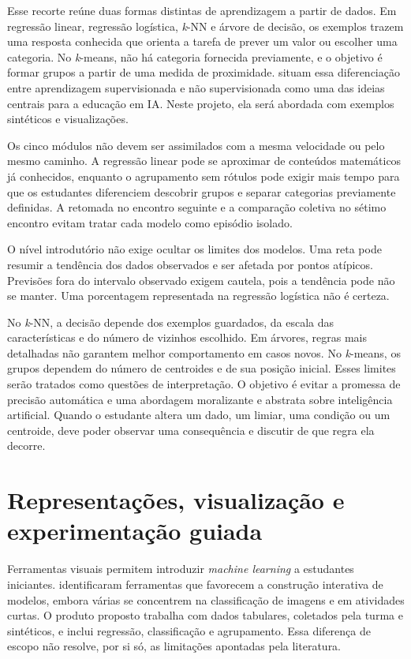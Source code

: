 Esse recorte reúne duas formas distintas de aprendizagem a partir de dados. Em regressão linear, regressão logística, \textit{k}-NN e árvore de decisão, os exemplos trazem uma resposta conhecida que orienta a tarefa de prever um valor ou escolher uma categoria. No \textit{k}-means, não há categoria fornecida previamente, e o objetivo é formar grupos a partir de uma medida de proximidade.  situam essa diferenciação entre aprendizagem supervisionada e não supervisionada como uma das ideias centrais para a educação em IA. Neste projeto, ela será abordada com exemplos sintéticos e visualizações.

Os cinco módulos não devem ser assimilados com a mesma velocidade ou pelo mesmo caminho. A regressão linear pode se aproximar de conteúdos matemáticos já conhecidos, enquanto o agrupamento sem rótulos pode exigir mais tempo para que os estudantes diferenciem descobrir grupos e separar categorias previamente definidas. A retomada no encontro seguinte e a comparação coletiva no sétimo encontro evitam tratar cada modelo como episódio isolado.

O nível introdutório não exige ocultar os limites dos modelos. Uma reta pode resumir a tendência dos dados observados e ser afetada por pontos atípicos. Previsões fora do intervalo observado exigem cautela, pois a tendência pode não se manter. Uma porcentagem representada na regressão logística não é certeza.

No \textit{k}-NN, a decisão depende dos exemplos guardados, da escala das características e do número de vizinhos escolhido. Em árvores, regras mais detalhadas não garantem melhor comportamento em casos novos. No \textit{k}-means, os grupos dependem do número de centroides e de sua posição inicial. Esses limites serão tratados como questões de interpretação. O objetivo é evitar a promessa de precisão automática e uma abordagem moralizante e abstrata sobre inteligência artificial. Quando o estudante altera um dado, um limiar, uma condição ou um centroide, deve poder observar uma consequência e discutir de que regra ela decorre.

\section{Representações, visualização e experimentação guiada}

Ferramentas visuais permitem introduzir \textit{machine learning} a estudantes iniciantes.  identificaram ferramentas que favorecem a construção interativa de modelos, embora várias se concentrem na classificação de imagens e em atividades curtas. O produto proposto trabalha com dados tabulares, coletados pela turma e sintéticos, e inclui regressão, classificação e agrupamento. Essa diferença de escopo não resolve, por si só, as limitações apontadas pela literatura.

